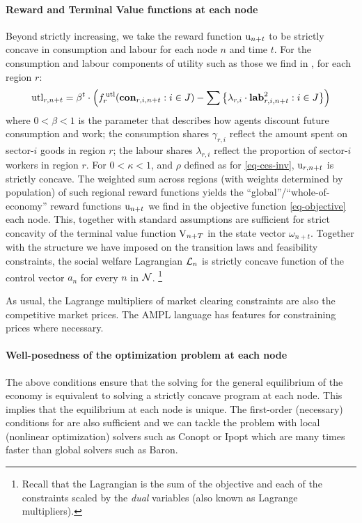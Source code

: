 \documentclass[12pt,a4paper,twoside, draft]{article}
\begin{document}
\paragraph{Reward and Terminal Value functions at each node}
Beyond strictly increasing, we take the reward function $\textup{u}_{n + t}$
to be strictly concave in consumption and labour for each node $n$ and time
$t$.
For the consumption and labour components of utility such as those we find in
\citet{Atalay-Sectoral_shocks}, for each region $r$:
\begin{equation}
  \textup{utl}_{r, n + t}
    = \beta^{t} \cdot \left(
	f_{r}^{\,\textup{utl}}(\mathbf{con}_{r, i, n + t}: i \in J)
        - \sum \left\{ \lambda_{r, i} \cdot \mathbf{lab}_{r, i, n + t}^{2}
        : i \in J \right\}
        \right)
\end{equation}
where $0 < \beta < 1$ is the parameter that describes how agents discount
future consumption and work; the consumption shares $\gamma_{r, i}$ reflect
the amount spent on sector-$i$ goods in region $r$; the labour shares
$\lambda_{r, i}$ reflect the proportion of sector-$i$ workers in region $r$.
For $0 < \kappa < 1$, and $\rho$ defined as for \cref{eq-ces-inv},
$\textup{u}_{r, n + t}$ is strictly concave.
The weighted sum across regions (with weights determined by population) of such
regional reward functions yields the ``global''/``whole-of-economy'' reward
functions $\textup{u}_{n + t}$ we find in the objective function
\eqref{eq-objective} each node.
This, together with standard assumptions \citep[Theorem
12.2.12]{Stachurski-Economic_dynamics} are sufficient for strict concavity of
the terminal value function $\textup{V}_{n + T}$ in the state vector
$\omega_{n + t}$.
Together with the structure we have imposed on the transition laws and
feasibility constraints, the social welfare Lagrangian $\mathcal L_{n}$ is
strictly concave function of the control vector $a_{n}$ for every $n$ in
$\mathcal N$.
\footnote{
Recall that the Lagrangian is the sum of the objective and each of the
constraints scaled by the \emph{dual} variables (also known as Lagrange
multipliers).
}
\begin{remark*}
As usual, the Lagrange multipliers of market clearing constraints are also the
competitive market prices.
The AMPL language has features for constraining prices where necessary.
\end{remark*}
\paragraph{Well-posedness of the optimization problem at each node}
The above conditions ensure that the solving for the general equilibrium of the
economy is equivalent to solving a strictly concave program at each node.
This implies that the equilibrium at each node is unique.
The first-order (necessary) conditions for are also sufficient and we can
tackle the problem with local (nonlinear optimization) solvers such as Conopt
or Ipopt which are many times faster than global solvers such as Baron.
\end{document}
